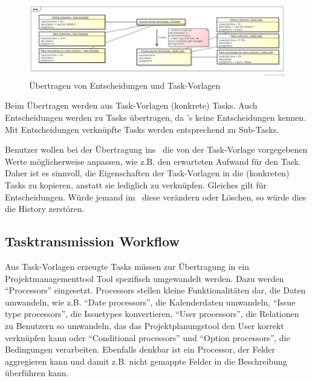 				\begin{figure}[H]
					\includegraphics[width=\textwidth]{architecture/media/img/decisionTaskRelation.png}
					\centering
					\caption{Übertragen von Entscheidungen und Task-Vorlagen}
					\label{fig:DecisionTaskRelation}
				\end{figure}
				
				Beim Übertragen werden aus Task-Vorlagen (konkrete) Tasks.
				Auch Entscheidungen werden zu Tasks übertragen, da \ppt's keine Entscheidungen kennen.
				Mit Entscheidungen verknüpfte Tasks werden entsprechend zu Sub-Tasks.
				
				Benutzer wollen bei der Übertragung ins \ppt\ die von der Task-Vorlage vorgegebenen Werte möglicherweise anpassen, wie z.B. den erwarteten Aufwand für den Task.
				Daher ist es sinnvoll, die Eigenschaften der Task-Vorlagen in die (konkreten) Tasks zu kopieren, anstatt sie lediglich zu verknüpfen.
				Gleiches gilt für Entscheidungen. Würde jemand im \cdar\ diese verändern oder Löschen, so würde dies die History zerstören.
			
		
		\subsection{Tasktransmission Workflow}
			Aus Task-Vorlagen erzeugte Tasks müssen zur Übertragung in ein Projektmanagementtool
			Tool spezifisch umgewandelt werden. Dazu werden "`Processors"' eingesetzt.
			Processors stellen kleine Funktionalitäten dar, die Daten umwandeln, wie z.B. "`Date processors"', die Kalenderdaten umwandeln, "`Issue type processors"', die Issuetypes konvertieren, "`User processors"', die Relationen zu Benutzern so umwandeln, das das Projektplanungstool den User korrekt verknüpfen kann oder "`Conditional processors"' und "`Option processors"', die Bedingungen verarbeiten.
			Ebenfalls denkbar ist ein Processor, der Felder aggregieren kann und damit z.B. nicht gemappte Felder in die Beschreibung überführen kann.
			
